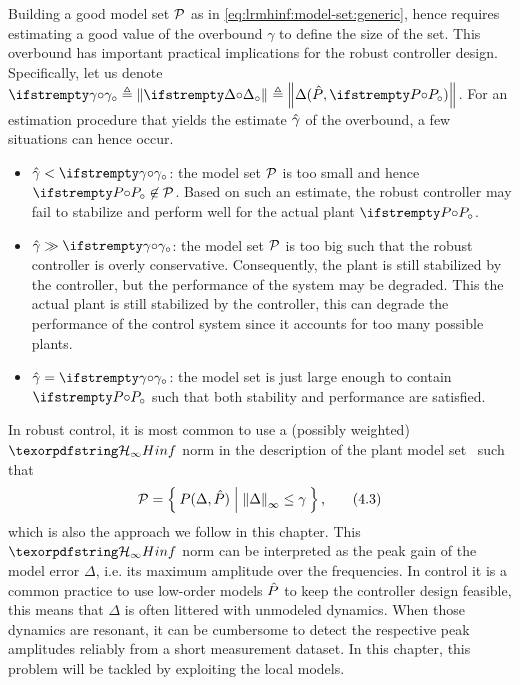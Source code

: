 \documentclass{responseletter}
\begin{document}
\begin{enumerate}
\begin{newquote}
Building a good model set $\ModelSet[]$ as in \eqref{eq:lrmhinf:model-set:generic}, hence requires estimating a good value of the overbound $\gamma$ to define the size of the set.
This overbound has important practical implications for the robust controller design.
Specifically, let us denote $\true{\gamma} \isdef \norm{\true\Delta} \isdef \norm{\Delta(\estimated{\Plant}, \true{\Plant})}$.
For an estimation procedure that yields the estimate $\estimated{\gamma}$ of the overbound, a few situations can hence occur.
\begin{itemize}
  \item $\estimated\gamma < \true{\gamma}$: the model set $\ModelSet[]$ is too small and hence $\true{\Plant} \not\in \ModelSet[]$.
  Based on such an estimate, the robust controller may fail to stabilize and perform well for the actual plant $\true{\Plant}$.
  \item $\estimated\gamma \gg \true{\gamma}$: the model set $\ModelSet[]$ is too big such that the robust controller is overly conservative.
  Consequently, the plant is still stabilized by the controller, but the performance of the system may be degraded.
  This  the actual plant is still stabilized by the controller, this can degrade the performance of the control system since it accounts for too many possible plants.
    \item $\estimated\gamma = \true{\gamma}$: the model set is just large enough to contain $\true{\Plant}$ such that both stability and performance are satisfied.
\end{itemize}

In robust control, it is most common to use a (possibly weighted) $\Hinf{}$ norm in the description of the plant model set~\citep{Skogestad2005,Zhou1996} such that
\begin{equation}
\ModelSet[] = \Set{ \Plant(\Delta, \estimated{\Plant}) | \norm[\infty]{\Delta 
} \leq \gamma}
  \text{,}
  \label{eq:lrmhinf:model-set:hinf}
  \tag{4.3}
\end{equation}
which is also the approach we follow in this chapter.
This $\Hinf{}$ norm can be interpreted as the peak gain of the model error $\Delta$, i.e. its maximum amplitude over the frequencies.
In control it is a common practice to use low-order models $\estimated{\Plant}$ to keep the controller design feasible, this means that $\Delta$ is often littered with unmodeled dynamics.
When those dynamics are resonant, it can be cumbersome to detect the respective peak amplitudes reliably from a short measurement dataset.
In this chapter, this problem will be tackled by exploiting the local models.
  \end{newquote}


\end{enumerate}
\end{document}
